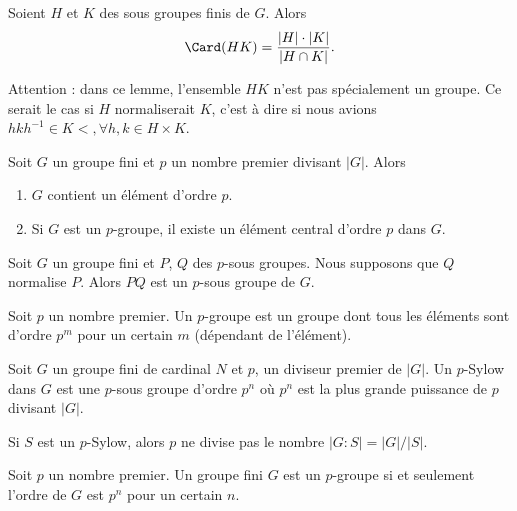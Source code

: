 \begin{lemma}
    Soient \( H\) et \( K\) des sous groupes finis de \( G\). Alors
    \begin{equation}
        \Card(HK)=\frac{ | H |\cdot | K | }{ | H\cap K | }.
    \end{equation}
\end{lemma} 
Attention : dans ce lemme, l'ensemble \( HK\) n'est pas spécialement un groupe. Ce serait le cas si \( H\) normaliserait \( K\), c'est à dire si nous avions \( hkh^{-1}\in K<,\forall h,k\in H\times K\).

\begin{theorem}       \label{ThoCauchyGpFini}
    Soit \( G\) un groupe fini et \( p\) un nombre premier divisant \( | G |\). Alors 
    \begin{enumerate}
        \item
            \( G\) contient un élément d'ordre \( p\).
        \item
            Si \( G\) est un \( p\)-groupe, il existe un élément central d'ordre \( p\) dans \( G\).
    \end{enumerate}
\end{theorem}

\begin{lemma}
    Soit \( G\) un groupe fini et \( P\), \( Q\) des \( p\)-sous groupes. Nous supposons que \( Q\) normalise \( P\). Alors \( PQ\) est un \( p\)-sous groupe de \( G\).
\end{lemma}


\begin{definition}
    Soit \( p\) un nombre premier. Un \( p\)-groupe est un groupe dont tous les éléments sont d'ordre \( p^m\) pour un certain \( m\) (dépendant de l'élément).

    Soit \( G\) un groupe fini de cardinal \( N\) et \( p\), un diviseur premier de $| G |$. Un \( p\)-Sylow dans \( G\) est une \( p\)-sous groupe d'ordre \( p^n\) où \( p^n\) est la plus grande puissance de \( p\) divisant \( | G |\).
\end{definition}

Si \( S\) est un \( p\)-Sylow, alors \( p\) ne divise pas le nombre \( | G:S |=| G |/| S |\).

\begin{proposition}
    Soit \( p\) un nombre premier. Un groupe fini \( G\) est un $p$-groupe si et seulement l'ordre de \( G\) est \( p^n\) pour un certain \( n\).
\end{proposition}

